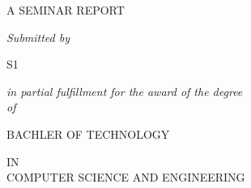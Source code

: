\begin{titlepage}
	
	\thispagestyle{empty}
         
	\begin{center}
		\vspace*{.2cm}
		\textbf{\fontsize{18}{12}}
	\end{center}

	\vspace*{0.5cm}

	\begin{center}
		\fontsize{14}{12}\MakeUppercase{A SEMINAR REPORT}
	\end{center}

	\vspace*{0.5cm}

	\begin{center}
		\textit{\fontsize{14}{12}Submitted by}
	\end{center}

	\vspace*{0.5cm}

	\begin{center}
		\fontsize{16}{12}\selectfont S1
	\end{center}

    	\vspace{0.5cm}

	\begin{center}
		\textit{\fontsize{14}{12}in partial fulfillment for the award of the degree\\of\\}
	\end{center}

	\vspace*{0.5cm}

	\begin{center}
		\fontsize{16}{12}\MakeUppercase{BACHLER OF TECHNOLOGY}\\
	\end{center}

	\vspace*{0.5cm}

	\begin{center}
		\fontsize{14}{12}\MakeUppercase{IN}\\
		\fontsize{14}{12}\MakeUppercase{COMPUTER SCIENCE AND ENGINEERING}\\
	\end{center}

	\vspace*{0.5cm}
	

\end{titlepage}

